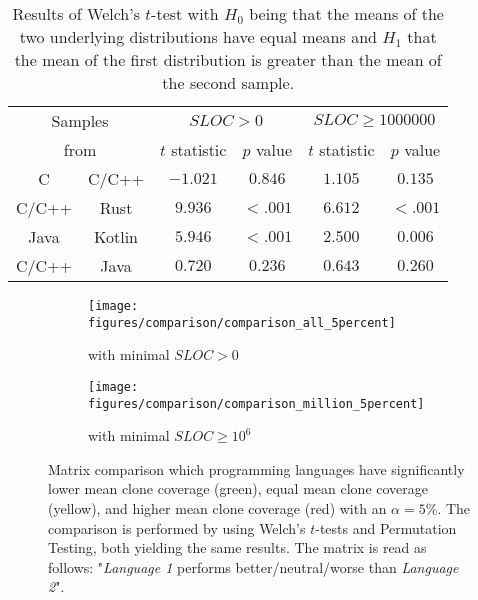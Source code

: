 \begin{table}[tbh!]
	\centering
	\begin{tabular}{|cc||c|c||c|c|}
		\hline
		\multicolumn{2}{|c||}{Samples} & \multicolumn{2}{c||}{$SLOC > 0$} & \multicolumn{2}{c|}{$SLOC \geq 1000000$}  \\
		\multicolumn{2}{|c||}{from} & \multicolumn{1}{c}{$t$ statistic} & \multicolumn{1}{c||}{$p$ value} & \multicolumn{1}{c}{$t$ statistic} & $p$ value \\
		\hline
		\hline
		C & C/C++ & $-1.021$ & $0.846$ & $1.105$ & $0.135$ \\
		\hline
		\hline
		C/C++ & Rust & $9.936$ & $<.001$ & $6.612$ & $<.001$ \\
		\hline
		Java & Kotlin & $5.946$ & $<.001$ & $2.500$ & $0.006$ \\
		\hline
		\hline
		C/C++ & Java & $0.720$ & $0.236$ & $0.643$ & $0.260$ \\
		\hline
	\end{tabular}
	\caption{Results of Welch's $t$-test with $H_0$ being that the means of the two underlying distributions have equal means and $H_1$ that the mean of the first distribution is greater than the mean of the second sample.}
	\label{tab:stat_test}
\end{table}

\begin{figure}[tbh!]
	\centering
	\begin{subfigure}[t]{0.49\textwidth}
		\texttt{[image: figures/comparison/comparison\_all\_5percent]}
		\caption{with minimal $SLOC > 0$}
		\label{fig:matrix_comp_all}
	\end{subfigure}
	\hfill
	\begin{subfigure}[t]{0.49\textwidth}
		\texttt{[image: figures/comparison/comparison\_million\_5percent]}
		\caption{with minimal $SLOC \geq 10^{6}$}
		\label{fig:matrix_comp_million}
	\end{subfigure}
	\caption{Matrix comparison which programming languages have significantly lower mean clone coverage (green), equal mean clone coverage (yellow), and higher mean clone coverage (red) with an $\alpha=5\%$. The comparison is performed by using Welch's $t$-tests and Permutation Testing, both yielding the same results. The matrix is read as follows: "\textit{Language 1} performs better/neutral/worse than \textit{Language 2}".}
	\label{fig:matrix_comp}
\end{figure}


